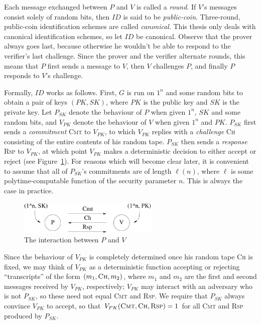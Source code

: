 Each message exchanged between $P$ and $V$ is called a {\it round}.  If $V$'s
messages consist solely of random bits, then $ID$ is said to be {\it
public-coin}. Three-round, public-coin identification schemes are called {\it
canonical}. This thesis only deals with canonical identification schemes, so
let $ID$ be canonical.  Observe that the prover always goes last, because
otherwise he wouldn't be able to respond to the verifier's last challenge.
Since the prover and the verifier alternate rounds, this means that $P$ first sends a message
to $V$, then $V$ challenges $P$, and finally $P$ responds to $V$'s challenge.

Formally, $ID$ works as follows. First, $G$ is run on $1^n$ and some random
bits to obtain a pair of keys $(PK,SK)$, where $PK$ is the public key and $SK$
is the private key.  Let $P_{SK}$ denote the behaviour of $P$ when given
$1^n$, $SK$ and some random bits, and $V_{PK}$ denote the behaviour of $V$
when given $1^n$ and $PK$.  $P_{SK}$ first sends a {\it commitment}
\textsc{Cmt} to $V_{PK}$, to which $V_{PK}$ replies with a {\it challenge}
\textsc{Ch} consisting of the entire contents of his random tape. $P_{SK}$
then sends a {\it response} \textsc{Rsp} to $V_{PK}$, at which point $V_{PK}$
makes a deterministic decision to either accept or reject (see
Figure~\ref{FIG:CanonicalID}). For reasons which will become clear later, it
is convenient to assume that all of $P_{SK}$'s commitments are of length
$\ell(n)$, where $\ell$ is some polytime-computable function of the security
parameter $n$. This is always the case in practice.

\begin{figure}[htb]
    \centering
    \includegraphics[width = 0.6\textwidth]{../figures/CanonicalIdScheme}
    \caption{The interaction between $P$ and $V$}
    \label{FIG:CanonicalID}
\end{figure}

Since the behaviour of $V_{PK}$ is completely determined once his random tape
\textsc{Ch} is fixed, we may think of $V_{PK}$ as a deterministic function
accepting or rejecting ``transcripts'' of the form $(m_1,\textsc{Ch},m_2)$,
where $m_1$ and $m_2$ are the first and second messages received by $V_{PK}$,
respectively; $V_{PK}$ may interact with an adversary who is not $P_{SK}$, so these
need not equal \textsc{Cmt} and \textsc{Rsp}. We require that $P_{SK}$ always
convince $V_{PK}$ to accept, so that
$V_{PK}(\textsc{Cmt},\textsc{Ch},\textsc{Rsp}) = 1$ for all \textsc{Cmt} and
\textsc{Rsp} produced by $P_{SK}$. 


